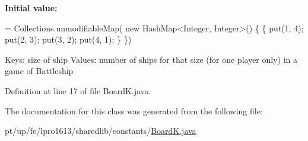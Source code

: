 {\bfseries Initial value\+:}
\begin{DoxyCode}
= Collections.unmodifiableMap(
                    \textcolor{keyword}{new} HashMap<Integer, Integer>() \{
                \{
                    put(1, 4);
                    put(2, 3);
                    put(3, 2);
                    put(4, 1);
                \}
            \})
\end{DoxyCode}
Keys\+: size of ship Values\+: number of ships for that size (for one player only) in a game of Battleship 

Definition at line 17 of file Board\+K.\+java.



The documentation for this class was generated from the following file\+:\begin{DoxyCompactItemize}
\item 
pt/up/fe/lpro1613/sharedlib/constants/\hyperlink{_board_k_8java}{Board\+K.\+java}\end{DoxyCompactItemize}
